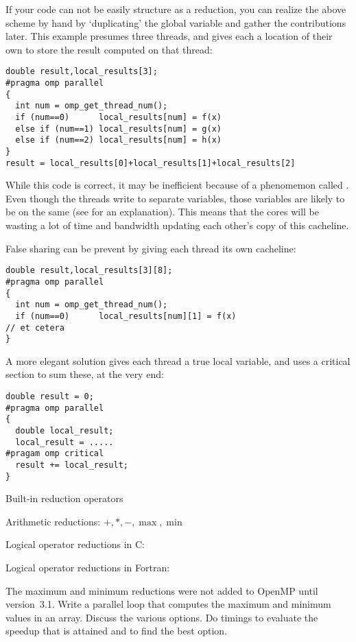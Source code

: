 If your code can not be easily structure as a reduction, you can 
realize the above scheme by hand by
`duplicating' the global variable and gather the contributions later.
This example presumes three threads, and gives each a location of their
own to store the result computed on that thread:
\begin{lstlisting}
double result,local_results[3];
#pragma omp parallel
{
  int num = omp_get_thread_num();
  if (num==0)      local_results[num] = f(x)
  else if (num==1) local_results[num] = g(x)
  else if (num==2) local_results[num] = h(x)
}
result = local_results[0]+local_results[1]+local_results[2]
\end{lstlisting}
While this code is correct, it may be inefficient because of a
phenomemon called . Even though the threads write
to separate variables, those variables are likely to be on the same 
 (see  for an explanation).
This means that the cores will be wasting a lot of time and bandwidth updating
each other's copy of this cacheline.

False sharing can be prevent by giving each thread its own cacheline:
\begin{lstlisting}
double result,local_results[3][8];
#pragma omp parallel
{
  int num = omp_get_thread_num();
  if (num==0)      local_results[num][1] = f(x)
// et cetera
}
\end{lstlisting}
A more elegant solution gives each thread a true local variable,
and uses a critical section to sum these, at the very end:
\begin{lstlisting}
double result = 0;
#pragma omp parallel
{
  double local_result;
  local_result = .....
#pragam omp critical
  result += local_result;
}
\end{lstlisting}

 {Built-in reduction operators}

Arithmetic reductions: $+,*,-,\max,\min$

Logical operator reductions in C: \n{& && | || ^}

Logical operator reductions in Fortran:

\begin{exercise}
  The maximum and minimum reductions were not added to OpenMP until
  version~3.1. Write a parallel loop that computes the maximum and
  minimum values in an array. Discuss the various options. Do timings
  to evaluate the speedup that is attained and to find the best option.
\end{exercise}

